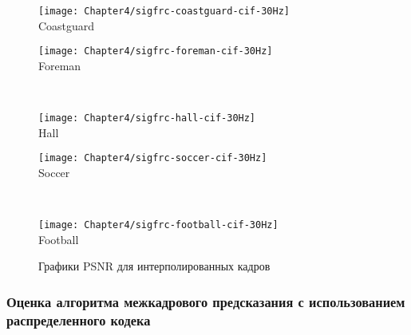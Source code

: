 \begin{figure}[htbp]
    \begin{center}
        \begin{minipage}{0.45\textwidth}
            \centering\texttt{[image: Chapter4/sigfrc-coastguard-cif-30Hz]} \\ Coastguard
        \end{minipage}
        \begin{minipage}{0.45\textwidth}
            \centering\texttt{[image: Chapter4/sigfrc-foreman-cif-30Hz]} \\ Foreman
        \end{minipage}
        \\
        \begin{minipage}{0.45\textwidth}
            \centering\texttt{[image: Chapter4/sigfrc-hall-cif-30Hz]} \\ Hall
        \end{minipage}
        \begin{minipage}{0.45\textwidth}
            \centering\texttt{[image: Chapter4/sigfrc-soccer-cif-30Hz]} \\ Soccer
        \end{minipage}
        \\
        \begin{minipage}{0.45\textwidth}
            \centering\texttt{[image: Chapter4/sigfrc-football-cif-30Hz]} \\ Football
        \end{minipage}
    \end{center}
    \caption{Графики PSNR для интерполированных кадров}
    \label{fig:SIBfPSNR}
\end{figure}

\subsubsection{Оценка алгоритма межкадрового предсказания с использованием распределенного кодека}
\label{chap:ExpResults:SchemeofExperiment:SIG:WithDVC}

